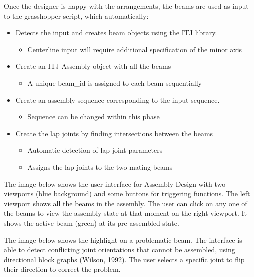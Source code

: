 \begin{itemize}
\begin{enumerate}
Once the designer is happy with the arrangements, the beams are used as input to the grasshopper script, which automatically:
\begin{itemize}
    \item Detects the input and creates beam objects using the ITJ library.
    \begin{itemize}
        \item Centerline input will require additional specification of the minor axis
    \end{itemize}
    \item Create an ITJ Assembly object with all the beams
    \begin{itemize}
        \item A unique beam_id is assigned to each beam sequentially
    \end{itemize}
    \item Create an assembly sequence corresponding to the input sequence.
    \begin{itemize}
        \item Sequence can be changed within this phase
    \end{itemize}
    \item Create the lap joints by finding intersections between the beams
    \begin{itemize}
        \item Automatic detection of lap joint parameters
        \item Assigns the lap joints to the two mating beams
    \end{itemize}
\end{itemize}
The image below shows the user interface for Assembly Design with two viewports (blue background) and some buttons for triggering functions. The left viewport shows all the beams in the assembly. The user can click on any one of the beams to view the assembly state at that moment on the right viewport. It shows the active beam (green) at its pre-assembled state.

The image below shows the highlight on a problematic beam. The interface is able to detect conflicting joint orientations that cannot be assembled, using directional block graphs (Wilson, 1992). The user selects a specific joint to flip their direction to correct the problem.


\end{enumerate}
\end{itemize}
